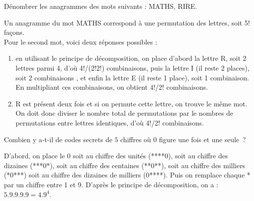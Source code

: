 \documentclass{book}
\begin{document}
\begin{Exercice}[Anagramme]
Dénombrer les anagrammes des mots suivants : MATHS, RIRE.
   
\begin{Correction}
Un anagramme du mot MATHS correspond à une permutation des lettres, soit  5! façons.\\
Pour le second mot, voici deux réponses possibles : 
\begin{enumerate}
\item en utilisant le principe de décomposition, on place d'abord la lettre R, soit 2 lettres parmi 4, d'où 4!/(2!2!) combinaisons, puis la lettre I (il reste 2 places), soit 2 combinaisons , et enfin la lettre E (il reste 1 place), soit 1 combinaison. En multipliant ces combinaisons, on obtient  4!/2! combinaisons.
\item R est présent deux fois et si on permute cette lettre, on trouve le même mot.
On doit donc diviser le nombre total de permutations par le nombres de permutations entre lettres identiques, d'où  4!/2! combinaisons.
\end{enumerate}
\end{Correction}

\end{Exercice}
\begin{Exercice}
Combien y a-t-il de codes secrets de $5$ chiffres où $0$ figure une fois et une seule~?

\begin{Correction}
D'abord, on place le $0$ soit au chiffre des unités (****0), soit au chiffre des dizaines (***0*), soit au chiffre des centaines (**0**), soit au chiffre des milliers (*0***) soit au chiffre des dizaines de milliers (0****). Puis on remplace chaque * par un chiffre entre 1 et 9.   D'après le principe de décomposition, on a :~$5.9.9.9.9=4.9^4$.
\end{Correction}

\end{Exercice}
\end{document}

